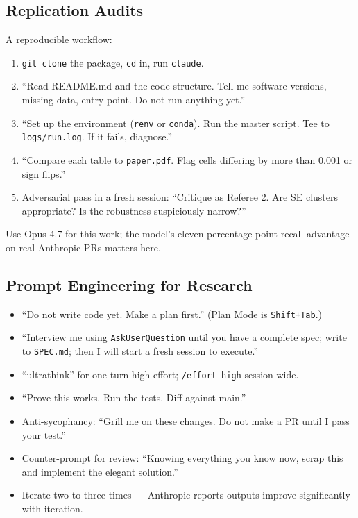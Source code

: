 \documentclass[11pt]{article}
\begin{document}
\subsection{Replication Audits}

A reproducible workflow:
\begin{enumerate}[leftmargin=*,nosep]
    \item \texttt{git clone} the package, \texttt{cd} in, run \texttt{claude}.
    \item ``Read README.md and the code structure. Tell me software versions, missing data, entry point. Do not run anything yet.''
    \item ``Set up the environment (\texttt{renv} or \texttt{conda}). Run the master script. Tee to \texttt{logs/run.log}. If it fails, diagnose.''
    \item ``Compare each table to \texttt{paper.pdf}. Flag cells differing by more than 0.001 or sign flips.''
    \item Adversarial pass in a fresh session: ``Critique as Referee 2. Are SE clusters appropriate? Is the robustness suspiciously narrow?''
\end{enumerate}

Use Opus 4.7 for this work; the model's eleven-percentage-point recall advantage on real Anthropic PRs matters here.

\subsection{Prompt Engineering for Research}

\begin{itemize}[leftmargin=*,nosep]
    \item ``Do not write code yet. Make a plan first.'' (Plan Mode is \texttt{Shift+Tab}.)
    \item ``Interview me using \texttt{AskUserQuestion} until you have a complete spec; write to \texttt{SPEC.md}; then I will start a fresh session to execute.''
    \item ``ultrathink'' for one-turn high effort; \texttt{/effort high} session-wide.
    \item ``Prove this works. Run the tests. Diff against main.''
    \item Anti-sycophancy: ``Grill me on these changes. Do not make a PR until I pass your test.''
    \item Counter-prompt for review: ``Knowing everything you know now, scrap this and implement the elegant solution.''
    \item Iterate two to three times --- Anthropic reports outputs improve significantly with iteration.
\end{itemize}
\end{document}
